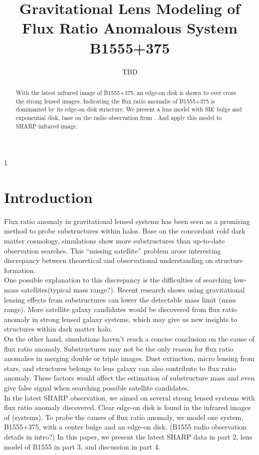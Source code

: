 1\documentclass[manuscript]{emulateapj}
\begin{document}
\title{Gravitational Lens Modeling of Flux Ratio Anomalous System B1555+375}
\author{TBD}

\begin{abstract}
With the latest infrared image of B1555+375, an edge-on disk is shown to over cross the strong lensed images. Indicating the flux ratio anomalie of B1555+375 is dominanted by its edge-on disk structure. We present a lens model with SIE bulge and exponential disk, base on the radio observation from \citet{Marlow}. And apply this model to SHARP infrared image.

\end{abstract}


\section{Introduction}
Flux ratio anomaly in gravitational lensed systems has been seen as a promising method to probe substructures within halos.
Base on the concordant cold dark matter cosmology, simulations show more substructures than up-to-date observation searches.
This ``missing satellite'' problem arose interesting discrepancy between theoretical and observational understanding on structure
formation. \\
One possible explanation to this discrepancy is the difficulties of searching low-mass satellites(typical mass range?). Recent research shows using gravitational lensing effects from substructures can lower the detectable mass limit (mass range). More satellite galaxy candidates would be discovered from flux ratio anomaly in strong lensed galaxy systems, which may give us new insights to structures within dark matter halo. \\
On the other hand, simulations haven't reach a concise conclusion on the cause of flux ratio anomaly. Substructures may not be the only reason for flux ratio anomalies in merging double or triple images. Dust extinction, micro lensing from stars, and structures belongs to lens galaxy can also contribute to flux ratio anomaly. These factors would affect the estimation of substructure mass and even give false signal when searching possible satellite candidates.\\
In the latest SHARP observation, we aimed on several strong lensed systems with flux ratio anomaly discovered. Clear edge-on disk is found in the infrared images of (systems). To probe the causes of flux ratio anomaly, we model one system, B1555+375, with a center bulge and an edge-on disk. (B1555 radio observation details in intro?) In this paper, we present the latest SHARP data in part 2, lens model of B1555 in part 3, and discussion in part 4. 
\end{document}
